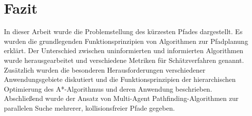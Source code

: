 \chapter{Fazit}

In dieser Arbeit wurde die Problemstellung des kürzesten Pfades dargestellt. Es wurden die grundlegenden Funktionsprinzipien von Algorithmen zur Pfadplanung erklärt. Der Unterschied zwischen uninformierten und informierten Algorithmen wurde herausgearbeitet und verschiedene Metriken für Schätzverfahren genannt. Zusätzlich wurden die besonderen Herausforderungen verschiedener Anwendungsgebiete diskutiert und die Funktionsprinzipien der hierarchischen Optimierung des A*-Algorithmus und deren Anwendung beschrieben. Abschließend wurde der Ansatz von Multi-Agent Pathfinding-Algorithmen zur parallelen Suche mehrerer, kollisionsfreier Pfade gegeben.